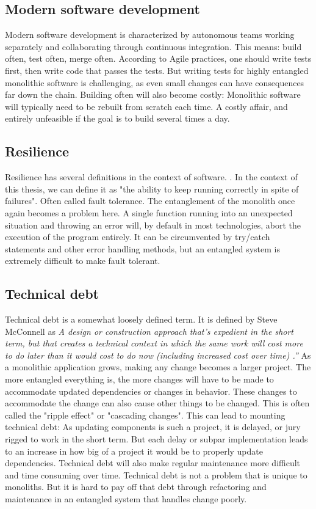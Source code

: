 \subsection{Modern software development}
Modern software development is characterized by autonomous teams working separately and collaborating through continuous integration.
This means: build often, test often, merge often.
According to Agile practices, one should write tests first, then write code that passes the tests.
But writing tests for highly entangled monolithic software is challenging, as even small changes can have consequences far down the chain.
Building often will also become costly: Monolithic software will typically need to be rebuilt from scratch each time.
A costly affair, and entirely unfeasible if the goal is to build several times a day.

\subsection{Resilience}
Resilience has several definitions in the context of software. \cite*{Curtis}.
In the context of this thesis, we can define it as "the ability to keep running correctly in spite of failures". Often called fault tolerance.
The entanglement of the monolith once again becomes a problem here.
A single function running into an unexpected situation and throwing an error will, by default in most technologies, abort the execution of the program entirely.
It can be circumvented by try/catch statements and other error handling methods, but an entangled system is extremely difficult to make fault tolerant.

\subsection{Technical debt}
Technical debt is a somewhat loosely defined term. It is defined by Steve McConnell as \textit{A
    design or construction approach that's expedient in the short term, but
    that creates a technical context in which the same work will cost more
    to do later than it would cost to do now (including increased cost over
    time) \cite*{McConnell2013}.”}
As a monolithic application grows, making any change becomes a larger project.
The more entangled everything is, the more changes will have to be made to accommodate updated dependencies or changes in behavior.
These changes to accommodate the change can also cause other things to be changed.
This is often called the "ripple effect" or "cascading changes".
This can lead to mounting technical debt: As updating components is such a project, it is delayed, or jury rigged to work in the short term.
But each delay or subpar implementation leads to an increase in how big of a project it would be to properly update dependencies.
Technical debt will also make regular maintenance more difficult and time consuming over time.
Technical debt is not a problem that is unique to monoliths.
But it is hard to pay off that debt through refactoring and maintenance in an entangled system that handles change poorly.




